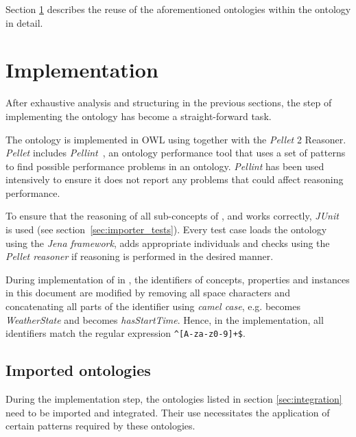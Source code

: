 Section \ref{sec:implementation} describes the reuse of the aforementioned ontologies within the \smarthomeweather ontology in detail.

\section{Implementation}
\label{sec:implementation}


After exhaustive analysis and structuring in the previous sections, the step of implementing the ontology has become a straight-forward task.

The \smarthomeweather ontology is implemented in OWL using  together with the \emph{Pellet}  2 Reasoner. \emph{Pellet} includes \emph{Pellint}~\cite{pellint}, an ontology performance tool that uses a set of patterns to find possible performance problems in an  ontology. \emph{Pellint} has been used intensively to ensure it does not report any problems that could affect reasoning performance.

To ensure that the reasoning of all sub-concepts of ,  and  works correctly, \emph{JUnit}~\cite{junit} is used (see section~\ref{sec:importer_tests}). Every test case loads the \smarthomeweather ontology using the \emph{Jena framework}, adds appropriate individuals and checks using the \emph{Pellet reasoner} if reasoning is performed in the desired manner.

During implementation of \smarthomeweather in , the identifiers of concepts, properties and instances in this document are modified by removing all space characters and concatenating all parts of the identifier using \emph{camel case}\cite{CamelCase}, e.g.  becomes \emph{WeatherState} and  becomes \emph{hasStartTime}. Hence, in the  implementation, all identifiers match the regular expression \texttt{\textasciicircum[A-za-z0-9]+\$}.


\subsection{Imported ontologies}
\label{sec:ontology_imports}

During the implementation step, the ontologies listed in section \ref{sec:integration} need to be imported and integrated. Their use necessitates the application of certain patterns required by these ontologies.

